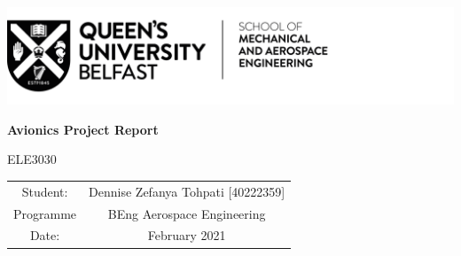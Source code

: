 \begin{titlepage}
\includegraphics[scale=1]{Figures/QUB LOGO - SMAE.png}
\centering

\vspace{6cm}
\textbf{Avionics Project Report}

ELE3030

\vspace{2cm}


\vspace{7cm}
\begin{tabular}{cc}
    Student: &  \quad Dennise Zefanya Tohpati [40222359]\\
    Programme & \quad BEng Aerospace Engineering\\
    Date: & \quad 26 February 2021
    
    
\end{tabular}
\end{titlepage}
